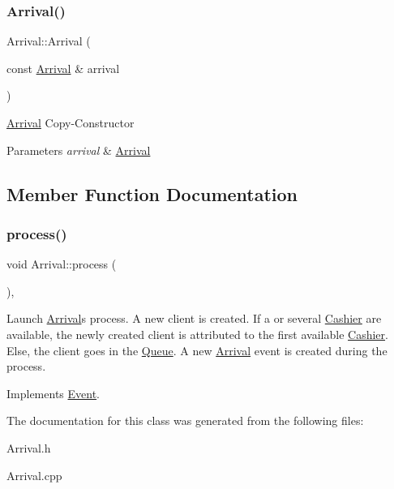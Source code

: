 \subsubsection{\texorpdfstring{Arrival()}{Arrival()}\hspace{0.1cm}{\footnotesize\ttfamily [2/2]}}
{\footnotesize\ttfamily Arrival\+::\+Arrival (\begin{DoxyParamCaption}\item[{const \hyperlink{classArrival}{Arrival} \&}]{arrival }\end{DoxyParamCaption})}

\hyperlink{classArrival}{Arrival} Copy-\/\+Constructor 
\begin{DoxyParams}{Parameters}
{\em arrival} & \hyperlink{classArrival}{Arrival} \\
\hline
\end{DoxyParams}


\subsection{Member Function Documentation}
\mbox{\label{classArrival_ad7da9fd4613164ece60d63be1bac6f1d}} 
\subsubsection{\texorpdfstring{process()}{process()}}
{\footnotesize\ttfamily void Arrival\+::process (\begin{DoxyParamCaption}{ }\end{DoxyParamCaption})\hspace{0.3cm}{\ttfamily [override]}, {\ttfamily [virtual]}}

Launch \hyperlink{classArrival}{Arrival}\textquotesingle{}s process. A new client is created. If a or several \hyperlink{classCashier}{Cashier} are available, the newly created client is attributed to the first available \hyperlink{classCashier}{Cashier}. Else, the client goes in the \hyperlink{classQueue}{Queue}. A new \hyperlink{classArrival}{Arrival} event is created during the process. 

Implements \hyperlink{classEvent_af1940e82c4da67c8119f0dfe026949b4}{Event}.



The documentation for this class was generated from the following files\+:\begin{DoxyCompactItemize}
\item 
Arrival.\+h\item 
Arrival.\+cpp\end{DoxyCompactItemize}
